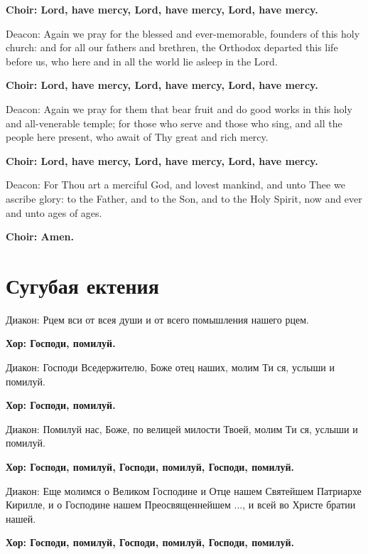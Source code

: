 \documentclass[12pt,a4paper,titlepage]{report}
\begin{document}
\begin{paracol}[1]{2}
	\textbf{Choir: Lord, have mercy, Lord, have mercy, Lord, have mercy.}
	
	Deacon: Again we pray for the blessed and ever-memorable, founders of this holy church: and for all our fathers and brethren, the Orthodox departed this life before us, who here and in all the world lie asleep in the Lord.
	
	\textbf{Choir: Lord, have mercy, Lord, have mercy, Lord, have mercy.}
	
	Deacon: Again we pray for them that bear fruit and do good works in this holy and all-venerable temple; for those who serve and those who sing, and all the people here present, who await of Thy great and rich mercy.
	
	\textbf{Choir: Lord, have mercy, Lord, have mercy, Lord, have mercy.}
	
	Deacon: For Thou art a merciful God, and lovest mankind, and unto Thee we ascribe glory: to the Father, and to the Son, and to the Holy Spirit, now and ever and unto ages of ages.
	
	\textbf{Choir: Amen.}
	
	\switchcolumn[1]
	
	\section*{Сугубая ектения}
	
	Диакон: Рцем вси от всея души и от всего помышления нашего рцем.
	
	\textbf{Хор: Господи, помилуй.}
	
	Диакон: Господи Вседержителю, Боже отец наших, молим Ти ся, услыши и помилуй.
	
	\textbf{Хор: Господи, помилуй.}
	
	Диакон: Помилуй нас, Боже, по велицей милости Твоей, молим Ти ся, услыши и помилуй.
	
	\textbf{Хор: Господи, помилуй, Господи, помилуй, Господи, помилуй.}
	
	Диакон: Еще молимся о Великом Господине и Отце нашем Святейшем Патриархе Кирилле, и о Господине нашем Преосвященнейшем ..., и всей во Христе братии нашей.
	
	\textbf{Хор: Господи, помилуй, Господи, помилуй, Господи, помилуй.}
	

\end{paracol}
\end{document}
